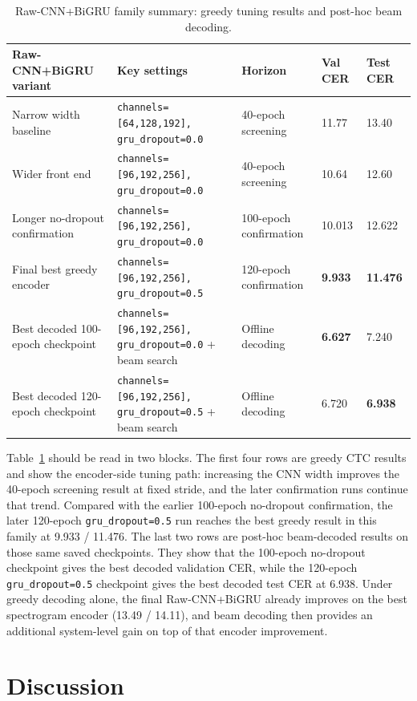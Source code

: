 \begin{table}[t]
\centering
\small
\caption{Raw-CNN+BiGRU family summary: greedy tuning results and post-hoc beam decoding.}
\label{tab:final}
\begin{tabular}{p{3.1cm}p{4.8cm}p{2.1cm}p{1.1cm}p{1.1cm}}
\hline
Raw-CNN+BiGRU variant & Key settings & Horizon & Val CER & Test CER \\
\hline
Narrow width baseline & \texttt{channels=[64,128,192], gru\_dropout=0.0} & 40-epoch screening & 11.77 & 13.40 \\
Wider front end & \texttt{channels=[96,192,256], gru\_dropout=0.0} & 40-epoch screening & 10.64 & 12.60 \\
Longer no-dropout confirmation & \texttt{channels=[96,192,256], gru\_dropout=0.0} & 100-epoch confirmation & 10.013 & 12.622 \\
Final best greedy encoder & \texttt{channels=[96,192,256], gru\_dropout=0.5} & 120-epoch confirmation & \textbf{9.933} & \textbf{11.476} \\
Best decoded 100-epoch checkpoint & \texttt{channels=[96,192,256], gru\_dropout=0.0} + beam search & Offline decoding & \textbf{6.627} & 7.240 \\
Best decoded 120-epoch checkpoint & \texttt{channels=[96,192,256], gru\_dropout=0.5} + beam search & Offline decoding & 6.720 & \textbf{6.938} \\
\hline
\end{tabular}
\end{table}

\FloatBarrier
Table~\ref{tab:final} should be read in two blocks. The first four rows are greedy CTC results and show the encoder-side tuning path: increasing the CNN width improves the 40-epoch screening result at fixed stride, and the later confirmation runs continue that trend. Compared with the earlier 100-epoch no-dropout confirmation, the later 120-epoch \texttt{gru\_dropout=0.5} run reaches the best greedy result in this family at 9.933 / 11.476. The last two rows are post-hoc beam-decoded results on those same saved checkpoints. They show that the 100-epoch no-dropout checkpoint gives the best decoded validation CER, while the 120-epoch \texttt{gru\_dropout=0.5} checkpoint gives the best decoded test CER at 6.938. Under greedy decoding alone, the final Raw-CNN+BiGRU already improves on the best spectrogram encoder (13.49 / 14.11), and beam decoding then provides an additional system-level gain on top of that encoder improvement.

\section{Discussion}

